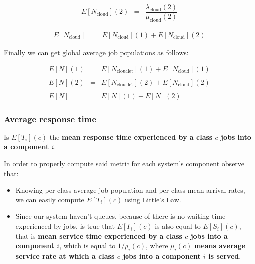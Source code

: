 \documentclass[10pt,a4paper]{article}
\begin{document}
\begin{equation}
\begin{array} {rcl} 
E[N_{\text{cloud}}](2) & = & \dfrac{\lambda_{\text{cloud}}(2)}{\mu_{\text{cloud}}(2)}
\end{array}
\end{equation}

\begin{equation}
\begin{array} {rcl} 
E[N_{\text{cloud}}] & = & E[N_{\text{cloud}}](1) + E[N_{\text{cloud}}](2)
\end{array}
\end{equation}

Finally we can get global average job populations as follows:

\begin{equation}
\begin{array} {rcl} 

E[N](1) & = & E[N_{\text{cloudlet}}](1) + E[N_{\text{cloud}}](1) \\\\

E[N](2) & = & E[N_{\text{cloudlet}}](2) + E[N_{\text{cloud}}](2) \\\\

E[N] & = & E[N](1) + E[N](2) 

\end{array}
\end{equation}


\subsubsection{Average response time}

Is $E[T_i](c)$ the \textbf{mean response time experienced by a class $c$ jobs into a component $i$}. 

In order to properly compute said metric for each system's component observe that:
\begin{itemize}
\item Knowing per-class average job population and per-class mean arrival rates, we can easily compute $E[T_i](c)$ using Little’s Law.
\item Since our system haven't queues, because of there is no waiting time experienced by jobs, is true that $E[T_i](c)$ is also equal to $E[S_i](c)$, that is \textbf{mean service time experienced by a class $c$ jobs into a component $i$}, which is equal to $1/\mu_i(c)$, where $\mu_i(c)$ \textbf{means average service rate at which a class $c$ jobs into a component $i$ is served}.
\end{itemize}
\end{document}
